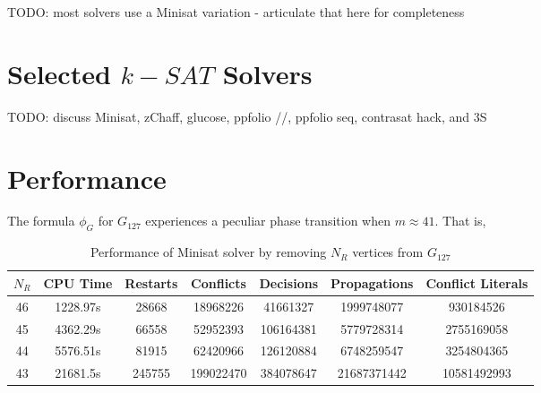 \documentclass[paper=a4, fontsize=11pt]{scrartcl} %
\begin{document}
{\color{red} TODO}: most solvers use a Minisat variation - articulate that here for completeness

\section{Selected $k-SAT$ Solvers}
{\color{red} TODO}: discuss Minisat, zChaff, glucose, ppfolio //, ppfolio seq, contrasat hack, and 3S

\section{Performance}
The formula $\phi_G$ for $G_{127}$ experiences a peculiar phase transition when $m \approx 41$. That is,


\begin{table}
	\caption{Performance of Minisat solver by removing $N_R$ vertices from $G_{127}$}
	\begin{tabular}{c | c | c | c | c | c | c}
		\hline
		$N_R$ & CPU Time & Restarts & Conflicts & Decisions & Propagations & Conflict Literals \\ \hline
		46 & 1228.97s & 28668 & 18968226 & 41661327 & 1999748077 & 930184526 \\ 
		45 & 4362.29s & 66558 & 52952393 & 106164381 & 5779728314 & 2755169058 \\ 
		44 & 5576.51s & 81915 & 62420966 & 126120884 & 6748259547 & 3254804365 \\ 
		43 & 21681.5s & 245755 & 199022470 & 384078647 & 21687371442 & 10581492993 \\ 
		\hline
	\end{tabular}
	\label{tab:performanceSat}
\end{table}


\end{document}
